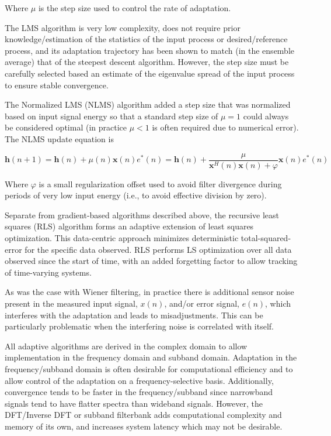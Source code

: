 \noindent
Where $\mu$ is the step size used to control the rate of adaptation. 

The LMS algorithm is very low complexity, does not require prior knowledge/estimation of the statistics of the input process or desired/reference process, and its adaptation trajectory has been shown to match (in the ensemble average) that of the steepest descent algorithm. However, the step size must be carefully selected based an estimate of the eigenvalue spread of the input process to ensure stable convergence.

The Normalized LMS (NLMS) algorithm added a step size that was normalized based on input signal energy so that a standard step size of $\mu=1$ could always be considered optimal (in practice $\mu < 1$ is often required due to numerical error). The NLMS update equation is

\begin{equation}
	\boldsymbol{h}(n+1) =
	\boldsymbol{h}(n) + \mu (n)\boldsymbol{x}(n)e^*(n) = 
	\boldsymbol{h}(n) + \frac{\mu}{\boldsymbol{x}^H(n)\boldsymbol{x}(n) + \varphi} \boldsymbol{x}(n)e^*(n)
\end{equation}

\noindent
Where $\varphi$ is a small regularization offset used to avoid filter divergence during periods of very low input energy (i.e., to avoid effective division by zero).

Separate from gradient-based algorithms described above, the recursive least squares (RLS) algorithm forms an adaptive extension of least squares optimization. This data-centric approach minimizes deterministic total-squared-error for the specific data observed. RLS performs LS optimization over all data observed since the start of time, with an added forgetting factor to allow tracking of time-varying systems.

As was the case with Wiener filtering, in practice there is additional sensor noise present in the measured input signal, $x(n)$, and/or error signal, $e(n)$, which interferes with the adaptation and leads to misadjustments. This can be particularly problematic when the interfering noise is correlated with itself.

All adaptive algorithms are derived in the complex domain to allow implementation in the frequency domain and subband domain. Adaptation in the frequency/subband domain is often desirable for computational efficiency and to allow control of the adaptation on a frequency-selective basis. Additionally, convergence tends to be faster in the frequency/subband since narrowband signals tend to have flatter spectra than wideband signals. However, the DFT/Inverse DFT or subband filterbank adds computational complexity and memory of its own, and increases system latency which may not be desirable.



